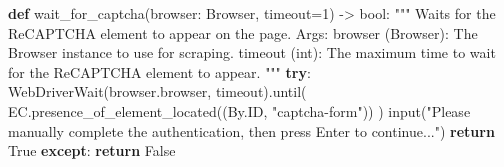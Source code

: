 \documentclass[
  titlepage]{article}
\newenvironment{Shaded}{\begin{snugshade}}{\end{snugshade}}
\newcommand{\BuiltInTok}[1]{\textcolor[rgb]{0.00,0.23,0.31}{#1}}
\newcommand{\CommentTok}[1]{\textcolor[rgb]{0.37,0.37,0.37}{#1}}
\newcommand{\ControlFlowTok}[1]{\textcolor[rgb]{0.00,0.23,0.31}{\textbf{#1}}}
\newcommand{\DecValTok}[1]{\textcolor[rgb]{0.68,0.00,0.00}{#1}}
\newcommand{\KeywordTok}[1]{\textcolor[rgb]{0.00,0.23,0.31}{\textbf{#1}}}
\newcommand{\NormalTok}[1]{\textcolor[rgb]{0.00,0.23,0.31}{#1}}
\newcommand{\OperatorTok}[1]{\textcolor[rgb]{0.37,0.37,0.37}{#1}}
\newcommand{\StringTok}[1]{\textcolor[rgb]{0.13,0.47,0.30}{#1}}
\newcommand{\VariableTok}[1]{\textcolor[rgb]{0.07,0.07,0.07}{#1}}
\begin{document}
\begin{Shaded}
\begin{Highlighting}[]
\KeywordTok{def}\NormalTok{ wait\_for\_captcha(browser: Browser, timeout}\OperatorTok{=}\DecValTok{1}\NormalTok{) }\OperatorTok{{-}\textgreater{}} \BuiltInTok{bool}\NormalTok{:}
    \CommentTok{"""}
\CommentTok{    Waits for the ReCAPTCHA element to appear on the page.}
\CommentTok{    Args:}
\CommentTok{        browser (Browser): The Browser instance to use for scraping.}
\CommentTok{        timeout (int): The maximum time to wait for the ReCAPTCHA element to appear.}
\CommentTok{    """}
    \ControlFlowTok{try}\NormalTok{:}
\NormalTok{        WebDriverWait(browser.browser, timeout).until(}
\NormalTok{            EC.presence\_of\_element\_located((By.ID, }\StringTok{"captcha{-}form"}\NormalTok{))}
\NormalTok{        )}
        \BuiltInTok{input}\NormalTok{(}\StringTok{"Please manually complete the authentication, then press Enter to continue..."}\NormalTok{)}
        \ControlFlowTok{return} \VariableTok{True}
    \ControlFlowTok{except}\NormalTok{:}
        \ControlFlowTok{return} \VariableTok{False}
\end{Highlighting}
\end{Shaded}
\end{document}
